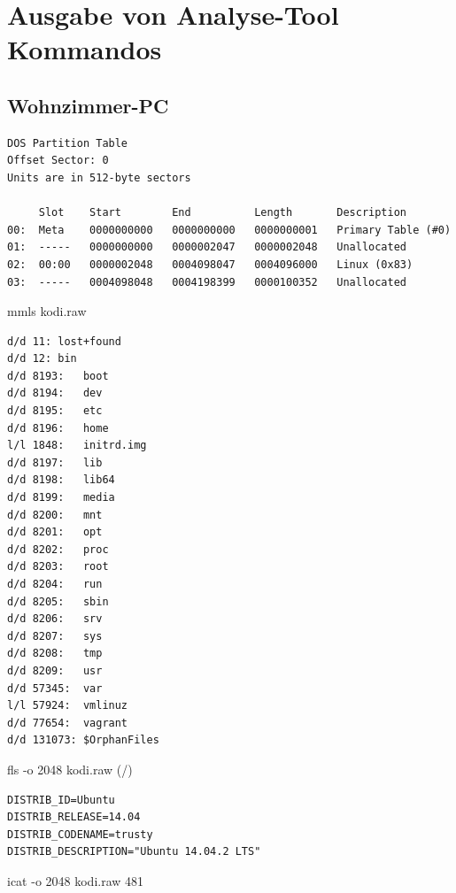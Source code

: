 \section{Ausgabe von Analyse-Tool Kommandos}

\subsection{Wohnzimmer-PC}

\begin{cmd}[H]
\begin{verbatim}
DOS Partition Table
Offset Sector: 0
Units are in 512-byte sectors

     Slot    Start        End          Length       Description
00:  Meta    0000000000   0000000000   0000000001   Primary Table (#0)
01:  -----   0000000000   0000002047   0000002048   Unallocated
02:  00:00   0000002048   0004098047   0004096000   Linux (0x83)
03:  -----   0004098048   0004198399   0000100352   Unallocated
\end{verbatim}
\caption{mmls kodi.raw}
\label{cmd:kodi-mmls}
\end{cmd}

\begin{cmd}[H]
\begin{verbatim}
d/d 11:	lost+found
d/d 12:	bin
d/d 8193:	boot
d/d 8194:	dev
d/d 8195:	etc
d/d 8196:	home
l/l 1848:	initrd.img
d/d 8197:	lib
d/d 8198:	lib64
d/d 8199:	media
d/d 8200:	mnt
d/d 8201:	opt
d/d 8202:	proc
d/d 8203:	root
d/d 8204:	run
d/d 8205:	sbin
d/d 8206:	srv
d/d 8207:	sys
d/d 8208:	tmp
d/d 8209:	usr
d/d 57345:	var
l/l 57924:	vmlinuz
d/d 77654:	vagrant
d/d 131073:	$OrphanFiles
\end{verbatim}
\caption{fls -o 2048 kodi.raw (/)}
\label{cmd:kodi-rootdir}
\end{cmd}

\begin{cmd}[H]
\begin{verbatim}
DISTRIB_ID=Ubuntu
DISTRIB_RELEASE=14.04
DISTRIB_CODENAME=trusty
DISTRIB_DESCRIPTION="Ubuntu 14.04.2 LTS"
\end{verbatim}
\caption{icat -o 2048 kodi.raw 481}
\label{cmd:kodi-lsb}
\end{cmd}

